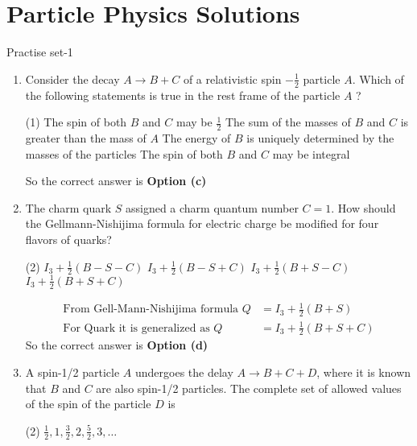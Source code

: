 \chapter{Particle Physics Solutions}
\begin{abox}
	Practise set-1
\end{abox}
\begin{enumerate}
	\item  Consider the decay $A \rightarrow B+C$ of a relativistic spin $-\frac{1}{2}$ particle $A$. Which of the following statements is true in the rest frame of the particle $A$ ?
	{}	
	\begin{tasks}(1)
		\task[\textbf{a.}]The spin of both $B$ and $C$ may be $\frac{1}{2}$
		\task[\textbf{b.}]The sum of the masses of $B$ and $C$ is greater than the mass of $A$
		\task[\textbf{c.}]The energy of $B$ is uniquely determined by the masses of the particles
		\task[\textbf{d.}]  The spin of both $B$ and $C$ may be integral
	\end{tasks}
	\begin{answer}
		So the correct answer is \textbf{Option (c)}
	\end{answer}
	\item  The charm quark $S$ assigned a charm quantum number $C=1$. How should the Gellmann-Nishijima formula for electric charge be modified for four flavors of quarks?
	{}
	\begin{tasks}(2)
		\task[\textbf{a.}]$I_3+\frac{1}{2}(B-S-C)$
		\task[\textbf{b.}]$I_3+\frac{1}{2}(B-S+C)$
		\task[\textbf{c.}] $I_3+\frac{1}{2}(B+S-C)$
		\task[\textbf{d.}]$I_3+\frac{1}{2}(B+S+C)$ 
	\end{tasks}
	\begin{answer}
		\begin{align*}
		\text{From Gell-Mann-Nishijima formula }Q&=I_3+\frac{1}{2}(B+S)\\
		\text{For Quark it is generalized as }Q&=I_3+\frac{1}{2}(B+S+C)
		\end{align*}
		So the correct answer is \textbf{Option (d)}
	\end{answer}
	\item  A spin-1/2 particle $A$ undergoes the delay $A \rightarrow B+C+D$, where it is known that $B$ and $C$ are also spin-1/2 particles. The complete set of allowed values of the spin of the particle $D$ is
	{}
	\begin{tasks}(2)
		\task[\textbf{a.}]$\frac{1}{2}, 1, \frac{3}{2}, 2, \frac{5}{2}, 3, \ldots$

\end{tasks}
\end{enumerate}

